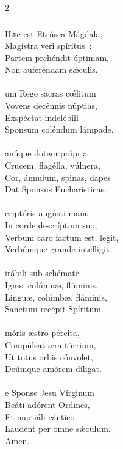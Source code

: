 \documentclass[9pt,twoside]{extarticle}
\begin{document}
\begin{multicols}{2}
{\subsubsection*{\center {}}
\begin{center}\end{center}
\lettrine{H}æc est Etrúsca Mágdala,\\
Magístra veri spíritus~:\\
Partem prehéndit óptimam,\\
Non auferéndam sǽculis.\\
\\
um Rege sacras cœ́litum\\
Vovens decénnis núptias,\\
Exspéctat indelébili\\
Sponsum coléndum lámpade.\\
\\
anúque dotem própria\\
Crucem, flagélla, vúlnera,\\
Cor, ánnulum, spinas, dapes\\
Dat Sponsus Eucharísticas.\\
\\
criptóris augústi manu\\
In corde descríptum suo,\\
Verbum caro factum est, legit,\\
Verbúmque grande intélligit.\\
\\
irábili sub schémate\\
Ignis, colúmnæ, flúminis,\\
Linguæ, colúmbæ, fláminis,\\
Sanctum recépit Spíritum.\\
\\
móris æstro pércita,\\
Compúlsat æra túrrium,\\
Ut totus orbis cónvolet,\\
Deúmque amórem díligat.\\
\\
e Sponse Jesu Vírginum\\
Beáti adórent Ordines,\\
Et nuptiáli cántico\\
Laudent per omne sǽculum.\\
Amen.

}
\end{multicols}
\end{document}
